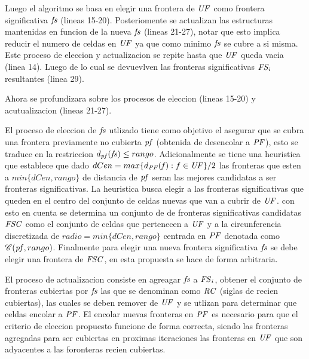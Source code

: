 Luego el algoritmo se basa en elegir una frontera de $\mathit{UF}$ como frontera
significativa $\mathit{fs}$ (lineas 15-20). Posteriomente se actualizan las
estructuras mantenidas en funcion de la nueva $\mathit{fs}$ (lineas 21-27), notar
que esto implica reducir el numero de celdas en $\mathit{UF}$ ya que como minimo
$\mathit{fs}$ se cubre a si misma. Este proceso de eleccion y actualizacion se
repite hasta que $\mathit{UF}$ queda vacia (linea 14). Luego de lo cual se
devuevlven las fronteras significativas $\mathit{FS_i}$ resultantes (linea 29).
 
Ahora se profundizara sobre los procesos de eleccion (lineas 15-20) y
acutualizacion (lineas 21-27).

El proceso de eleccion de $\mathit{fs}$ utlizado tiene como objetivo el asegurar
que se cubra una frontera previamente no cubierta $\mathit{pf}$ (obtenida de
desencolar a $\mathit{PF}$), esto se traduce en la restriccion
$d_{\mathit{pf}}(\mathit{fs}) \leq rango$. Adicionalmente se tiene una heuristica que
establece que dado $dCen = max\{ d_{\mathit{PF}}(\mathit{f}) : f\in\mathit{UF} \}/2$ las
fronteras que esten a $min \{dCen, rango\}$ de distancia de $\mathit{pf}$ seran las
mejores candidatas a ser fronteras significativas. La heuristica busca elegir a
las fronteras significativas que queden en el centro del conjunto de celdas
nuevas que van a cubrir de $\mathit{UF}$. con esto en cuenta se determina un
conjunto de de fronteras significativas candidatas $\mathit{FSC}$ como el conjunto
de celdas que pertenecen a $\mathit{UF}$ y a la circunferencia discretizada
de $radio = min \{dCen, rango\}$ centrada en $\mathit{PF}$ denotada como
$\mathscr{C}(\mathit{pf},rango)$. Finalmente para elegir una nueva frontera
significativa $\mathit{fs}$ se debe elegir una frontera de $\mathit{FSC}$, en esta
propuesta se hace de forma arbitraria.

El proceso de actualizacion consiste en agreagar $\mathit{fs}$ a $\mathit{FS}_i$, obtener el
conjunto de fronteras cubiertas por $\mathit{fs}$ las que se denominan como
$\mathit{RC}$ (siglas de recien cubiertas), las cuales se deben remover de
$\mathit{UF}$ y se utlizan para determinar que celdas encolar a $\mathit{PF}$.
El encolar nuevas fronteras en $\mathit{PF}$ es necesario para que el criterio de
eleccion propuesto funcione de forma correcta, siendo las fronteras agregadas
para ser cubiertas en proximas iteraciones las fronteras en $\mathit{UF}$ que son
adyacentes a las foronteras recien cubiertas.

